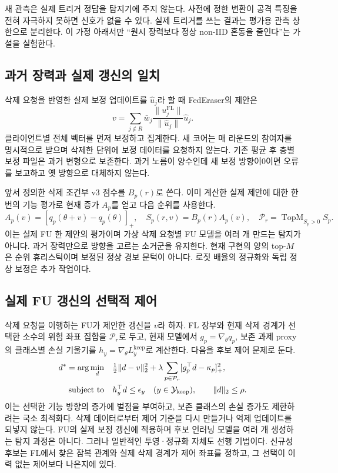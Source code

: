 \documentclass[10pt,a4paper]{article}
\begin{document}
새 관측은 실제 트리거 정답을 탐지기에 주지 않는다.
사전에 정한 변환이 공격 특징을 전혀 자극하지 못하면 신호가 없을 수 있다.
실제 트리거를 쓰는 결과는 평가용 관측 상한으로 분리한다.
이 가정 아래서만 ``원시 장력보다 정상 non-IID 혼동을 줄인다''는 가설을 실험한다.

\subsection{과거 장력과 실제 갱신의 일치}
삭제 요청을 반영한 실제 보정 업데이트를 $\widehat u_j$라 할 때 FedEraser의 제안은
\begin{equation}
 v=\sum_{j\notin R}\bar w_j\frac{\|u_j^{\mathrm{FL}}\|}{\|\widehat u_j\|}\widehat u_j.
\end{equation}
클라이언트별 전체 벡터를 먼저 보정하고 집계한다. 새 코어는 매 라운드의 참여자를 명시적으로
받으며 삭제한 단위에 보정 데이터를 요청하지 않는다. 기존 평균 후 층별 보정 파일은 과거 변형으로 보존한다.
과거 노름이 양수인데 새 보정 방향이0이면 오류를 보고하고 옛 방향으로 대체하지 않는다.

앞서 정의한 삭제 조건부 v3 점수를 $B_p(r)$로 쓴다. 이미 계산한 실제 제안에 대한
한 번의 기능 평가로 현재 증가 $A_p$를 얻고 다음 순위를 사용한다.
\begin{equation}\label{eq:action-selection}
 A_p(v)=[q_p(\theta+v)-q_p(\theta)]_+,\quad
 S_p(r,v)=B_p(r)A_p(v),\quad
 \mathcal P_r=\operatorname{TopM}_{S_p>0}S_p.
\end{equation}
이는 실제 FU 한 제안의 평가이며 가상 삭제 요청별 FU 모델을 여러 개 만드는 탐지가 아니다.
과거 장력만으로 방향을 고르는 소거군을 유지한다. 현재 구현의 양의 top-$M$은 순위 휴리스틱이며
보정된 정상 경보 문턱이 아니다. 로짓 배율의 정규화와 독립 정상 보정은 추가 작업이다.

\subsection{실제 FU 갱신의 선택적 제어}
삭제 요청을 이행하는 FU가 제안한 갱신을 $v$라 하자.
FL 장부와 현재 삭제 경계가 선택한 소수의 위험 좌표 집합을 $\mathcal P_r$로 두고,
현재 모델에서 $g_p=\nabla_\theta q_p$, 보존 과제 proxy의 클래스별 손실 기울기를
$h_y=\nabla_\theta L_y^{\mathrm{keep}}$로 계산한다. 다음을 후보 제어 문제로 둔다.
\begin{align}\label{eq:controlled-step}
 d^*=\arg\min_d\quad&\tfrac12\|d-v\|_2^2
       +\lambda\sum_{p\in\mathcal P_r}[g_p^\top d-\kappa_p]_+^2,\\
 \text{subject to}\quad&h_y^\top d\le\epsilon_y\quad(y\in\mathcal Y_{\mathrm{keep}}),
       \qquad\|d\|_2\le\rho.\notag
\end{align}
이는 선택한 기능 방향의 증가에 벌점을 부여하고,
보존 클래스의 손실 증가도 제한하려는 국소 최적화다.
삭제 데이터로부터 제어 기준을 다시 만들거나 억제 업데이트를 되넣지 않는다.
FU의 실제 보정 갱신에 적용하며 후보 언러닝 모델을 여러 개 생성하는 탐지 과정은 아니다.
그러나 일반적인 투영·정규화 자체도 선행 기법이다. 신규성 후보는 FL에서 찾은 잠복 관계와
실제 삭제 경계가 제어 좌표를 정하고, 그 선택이 이력 없는 제어보다 나은지에 있다.
\end{document}
